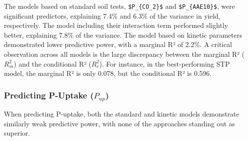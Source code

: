 \documentclass[
  a4paper,
]{article}
\begin{document}
The models based on standard soil tests, \texttt{\$P\_\{CO\_2\}\$} and
\texttt{\$P\_\{AAE10\}\$}, were significant predictors, explaining 7.4\%
and 6.3\% of the variance in yield, respectively. The model including
their interaction term performed slightly better, explaining 7.8\% of
the variance. The model based on kinetic parameters demonstrated lower
predictive power, with a marginal R² of 2.2\%. A critical observation
across all models is the large discrepancy between the marginal R²
(\(R^2_m\)) and the conditional R² (\(R^2_c\)). For instance, in the
best-performing STP model, the marginal R² is only 0.078, but the
conditional R² is 0.596.

\subsubsection{\texorpdfstring{Predicting P-Uptake
(\(P_{up}\))}{Predicting P-Uptake (P\_\{up\})}}\label{predicting-p-uptake-p_up}

When predicting P-uptake, both the standard and kinetic models
demonstrate similarly weak predictive power, with none of the approaches
standing out as superior.
\end{document}
